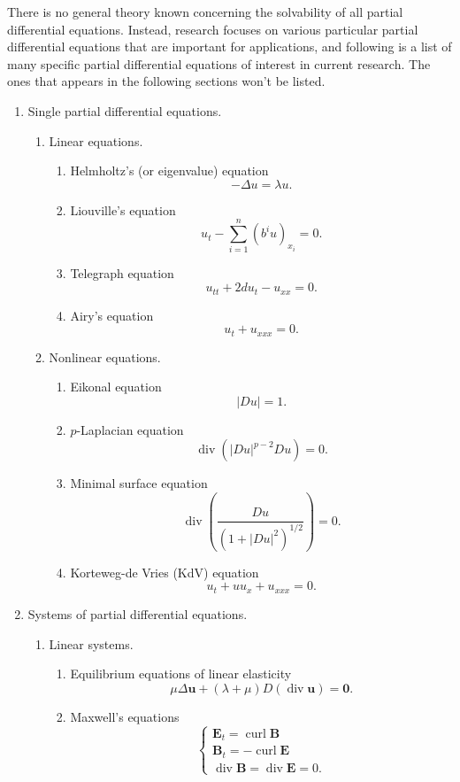 \documentclass[hyperref,UTF8,12pt]{article}
\numberwithin{equation}{subsection}
\theoremstyle{plain}
\theoremstyle{definition}
\numberwithin{theorem}{section}
\numberwithin{lemma}{section}
\numberwithin{proposition}{section}
\numberwithin{remark}{section}
\numberwithin{corollary}{section}
\numberwithin{definition}{section}
\numberwithin{problem}{section}
\numberwithin{example}{section}
\newcommand{\divv}{\operatorname{div}}
\newcommand{\curl}{\operatorname{curl}}
\begin{document}
There is no general theory known concerning the solvability of all partial differential equations. Instead, research focuses on various particular partial differential equations that are important for applications, and following is a list of many specific partial differential equations of interest in current research. The ones that appears in the following sections won't be listed.
\begin{enumerate}
	\item Single partial differential equations.
	\begin{enumerate}
		\item Linear equations.
		\begin{enumerate}
			\item Helmholtz's (or eigenvalue) equation\[-\Delta u=\lambda u.\]
			\item Liouville's equation\[u_t-\sum_{i=1}^n(b^iu)_{x_i}=0.\]
			\item Telegraph equation\[u_{tt}+2du_t-u_{xx}=0.\]
			\item Airy's equation\[u_t+u_{xxx}=0.\]
		\end{enumerate}
		\item Nonlinear equations.
		\begin{enumerate}
			\item Eikonal equation\[|Du|=1.\]
			\item $p$-Laplacian equation
			\[\divv(|Du|^{p-2}Du)=0.\]
			\item Minimal surface equation
			\[\divv\left(\frac{Du}{(1+|Du|^2)^{1/2}}\right)=0.\]
			\item Korteweg-de Vries (KdV) equation\[u_t+uu_x+u_{xxx}=0.\]
		\end{enumerate}
	\end{enumerate}
	\item Systems of partial differential equations.
	\begin{enumerate}
		\item Linear systems.
		\begin{enumerate}
			\item Equilibrium equations of linear elasticity
			\[\mu\Delta\mathbf{u}+(\lambda+\mu) D(\divv\mathbf{u})=\mathbf{0}.\]
			\item Maxwell's equations\[\begin{cases}
				\mathbf{E}_t=\curl\mathbf{B}\\
				\mathbf{B}_t=-\curl\mathbf{E}\\
				\divv\mathbf{B}=\divv\mathbf{E}=0.
			\end{cases}\]

\end{enumerate}
\end{enumerate}
\end{enumerate}
\end{document}
